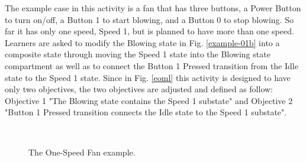 \documentclass[conference]{IEEEtran}
\begin{document}
The example case in this activity is a fan that has three buttons, a Power Button to turn on/off, a Button 1 to start blowing, and a Button 0 to stop blowing. So far it has only one speed, Speed 1, but is planned to have more than one speed. Learners are asked to modify the Blowing state in Fig. \ref{example-01b} into a composite state through moving the Speed 1 state into the Blowing state compartment as well as to connect the Button 1 Pressed transition from the Idle state to the Speed 1 state. Since in Fig. \ref{eoml} this activity is designed to have only two objectives, the two objectives are adjusted and defined as follow: Objective 1 "The Blowing state contains the Speed 1 substate" and Objective 2 "Button 1 Pressed transition connects the Idle state to the Speed 1 substate".

\begin{figure}[!t]
    \centering
    \\
	\caption{The One-Speed Fan example.}
    \label{example-01}
\end{figure}
\end{document}

